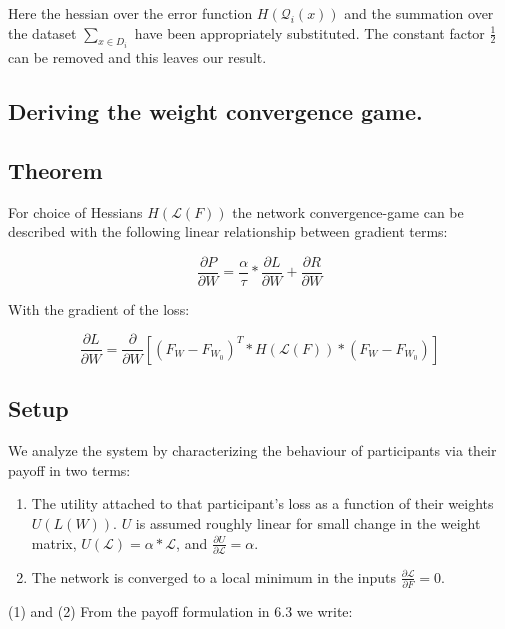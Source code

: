 \documentclass{article}
\begin{document}
Here the hessian over the error function $H(\mathcal{Q}_i(x))$ and the summation over the dataset $\sum_{x \in D_i}$ have been appropriately substituted. The constant factor $\frac{1}{2}$ can be removed and this leaves our result.
\smallskip

\subsection{Deriving the weight convergence game.}

\subsection{Theorem}

For choice of Hessians $H(\mathcal{L}(F))$ the network convergence-game can be described with the following linear relationship between gradient terms:

\begin{equation}
\frac{\partial P}{\partial W} = \frac{\alpha}{\tau} * \frac{\partial L}{\partial W} + \frac{\partial R}{\partial W}
\end{equation}
\smallskip

With the gradient of the loss:

\begin{equation}
\frac{\partial L}{\partial W} = \frac{\partial}{\partial W} [(F_W - F_{W_0})^T * H( \mathcal{L}(F)) * (F_W - F_{W_0})] 
\end{equation}
\smallskip


\subsection{Setup}

We analyze the system by characterizing the behaviour of participants via their payoff in two terms:

\begin{enumerate}
	\item The utility attached to that participant’s loss as a function of their weights $U(L(W))$. $U$ is assumed roughly linear for small change in the weight matrix, $U(\mathcal{L}) = \alpha*\mathcal{L}$, and $\frac{\partial U}{\partial \mathcal{L}} = \alpha$.
	\item The network is converged to a local minimum in the inputs $\frac{\partial\mathcal{L}}{\partial F} = 0$.
\end{enumerate} (1)  and (2)  From the payoff formulation in 6.3 we write:
\smallskip
\end{document}
